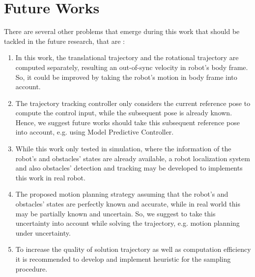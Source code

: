 \documentclass[../thesis.tex]{subfiles}
\begin{document}
\section{Future Works}

There are several other problems that emerge during this work that should be tackled in the future research, that are :

\begin{enumerate}
\item In this work, the translational trajectory and the rotational trajectory are computed separately, resulting an out-of-sync velocity in robot's body frame. So, it could be improved by taking the robot's motion in body frame into account.
\item The trajectory tracking controller only considers the current reference pose to compute the control input, while the subsequent pose is already known. Hence, we suggest future works should take this subsequent reference pose into account, e.g. using Model Predictive Controller.
\item While this work only tested in simulation, where the information of the robot's and obstacles' states are already available, a robot localization system and also obstacles' detection and tracking may be developed to implements this work in real robot.
\item The proposed motion planning strategy assuming that the robot's and obstacles' states are perfectly known and accurate, while in real world this may be partially known and uncertain. So, we suggest to take this uncertainty into account while solving the trajectory, e.g. motion planning under uncertainty.
\item To increase the quality of solution trajectory as well as computation efficiency it is recommended to develop and implement heuristic for the sampling procedure.
\end{enumerate}
\end{document}
